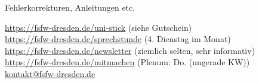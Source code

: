 \documentclass[t]{beamer}
\begin{document}
\begin{frame}[label=ct5]{\color{fg}{Weitere Informationen}}
 \vspace{6mm}
 Fehlerkorrekturen, Anleitungen etc.
 \vspace{6mm}
 
\url{https://fsfw-dresden.de/uni-stick} {\tiny(siehe Gutschein)}\\[3mm]

\url{https://fsfw-dresden.de/sprechstunde} {\tiny(4. Dienstag im Monat)}\\[3mm]
\url{https://fsfw-dresden.de/newsletter} {\tiny (ziemlich selten, sehr informativ)}\\[3mm]

\url{https://fsfw-dresden.de/mitmachen} {\tiny(Plenum: Do. (ungerade KW))}\\[3mm]

\url{kontakt@fsfw-dresden.de} \\[3mm]




\end{frame}


\end{document}
